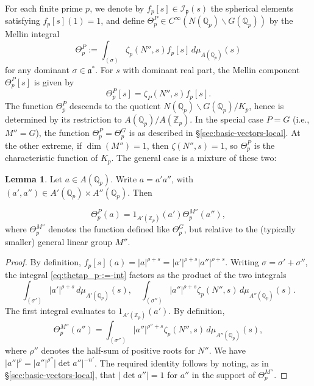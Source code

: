 \documentclass[reqno]{amsart}
\theoremstyle{plain} \newtheorem{theorem} {Theorem}
\theoremstyle{definition} \newtheorem{definition} [theorem] {Definition}
\theoremstyle{itplain} %
\newtheorem{lemma}[theorem]{Lemma}
\numberwithin{equation}{section}
\numberwithin{theorem}{section}
\begin{document}
For each finite prime $p$, we denote by $f_p[s] \in \mathcal{I}_\mathfrak{p}(s)$ the spherical elements satisfying $f_p[s](1) = 1$, and define $\Theta^P_p \in C^\infty(N(\mathbb{Q}_p) \backslash G(\mathbb{Q}_p))$ by the Mellin integral 
\begin{equation}\label{eq:thetap_p-:=-int}
  \Theta^P_p :=
  \int _{(\sigma)}
  \zeta_p(N'', s) f_p[s]
  \, d \mu_{A(\mathbb{Q}_p)}(s)
\end{equation}
for any dominant $\sigma \in \mathfrak{a}^*$.  For $s$ with dominant real part, the Mellin component $\Theta_p^P[s]$ is given by
\begin{equation*}
  \Theta_p^P[s] = \zeta_P(N'',s) f_p[s].
\end{equation*}
The function $\Theta_p^P$ descends to the quotient $N(\mathbb{Q}_p) \backslash G(\mathbb{Q}_p) / K_p$, hence is determined by its restriction to $A(\mathbb{Q}_p)/A(\mathbb{Z}_p)$.  In the special case $P = G$ (i.e., $M'' = G$), the function $\Theta_p^P = \Theta_p^G$ is as described in \S\ref{sec:basic-vectors-local}.  At the other extreme, if $\dim(M'') = 1$, then $\zeta(N'',s) = 1$, so $\Theta^P_p$ is the characteristic function of $K_p$.  The general case is a mixture of these two:
\begin{lemma}\label{lem:Theta-P-p}
  Let $a \in A(\mathbb{Q}_p)$.  Write $a = a' a''$, with $(a',a'') \in A'(\mathbb{Q}_p) \times A''(\mathbb{Q}_p)$.  Then

  \begin{equation}\label{eq:thet-=-1_am}
    \Theta_p^P(a) = 1_{A'(\mathbb{Z}_p)}(a')
    \Theta^{M''}_p(a''),
  \end{equation}
  where $\Theta^{M''}_p$ denotes the function defined like $\Theta^G_p$, but relative to the (typically smaller) general linear group $M''$.
\end{lemma}
\begin{proof}
  By definition, $f_p[s](a) = |a|^{\rho + s} = |a'|^{\rho + s} |a''|^{\rho + s}$.  Writing $\sigma = \sigma ' + \sigma ''$, the integral \eqref{eq:thetap_p-:=-int} factors as the product of the two integrals
  \begin{equation*}
    \int _{(\sigma')}
    |a'|^{\rho + s}
    \, d \mu_{A'(\mathbb{Q}_p)}(s),
    \quad
    \int _{(\sigma '')}
    |a''|^{\rho + s}
    \zeta_p(N'',s) \, d \mu_{A''(\mathbb{Q}_p)}(s).
  \end{equation*}
  The first integral evaluates to $1_{A'(\mathbb{Z}_p)}(a')$.  By definition,
  \begin{equation*}
    \Theta_p^{M''}(a'') = \int _{(\sigma '')} |a''|^{\rho '' + s} \zeta_p(N'',s) \, d \mu_{A''(\mathbb{Q}_p)}(s),
  \end{equation*}
  where $\rho ''$ denotes the half-sum of positive roots for $N''$.  We have $|a''|^{\rho} = |a''|^{\rho ''} |\det a''|^{-n'}$.  The required identity follows by noting, as in \S\ref{sec:basic-vectors-local}, that $|\det a''| = 1$ for $a''$ in the support of $\Theta_p^{M''}$. 
\end{proof}
\end{document}
